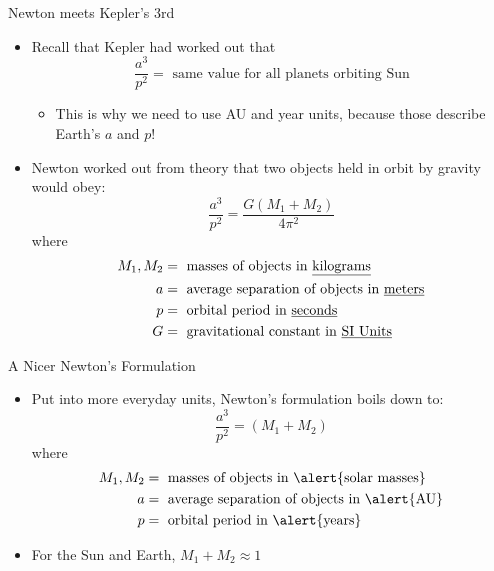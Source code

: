 \documentclass[pdf, aspectratio=169]{beamer}
\begin{document}
\begin{frame}{Newton meets Kepler's 3rd}
  \begin{itemize}
	\item Recall that Kepler had worked out that
	  \[\frac{a^3}{p^2}= \text{ same value for all planets orbiting Sun}\]
	  \begin{itemize}
		\item \alert{This is why we need to use AU and year units, because those describe Earth's $a$ and $p$!}
	  \end{itemize}
	\item<2> Newton worked out from theory that two objects held in orbit by gravity would obey:
	  \[\frac{a^3}{p^2} = \frac{G \left( M_1 + M_2 \right)}{4\pi^2}\]
	  where
	  \vspace{-2mm}
	  \scriptsize
	  \begin{align*}
		M_1, M_2 &= \text{ masses of objects in \underline{kilograms}}\\
		a &= \text{ average separation of objects in \underline{meters}}\\
		p &= \text{ orbital period in \underline{seconds}}\\
		G &= \text{ gravitational constant in \underline{SI Units}}
	  \end{align*}
  \end{itemize}
\end{frame}

\begin{frame}{A Nicer Newton's Formulation}
  \begin{itemize}
	\item Put into more everyday units, Newton's formulation boils down to:
		\[\frac{a^3}{p^2} = (M_1 + M_2)\]
	  where
	  \vspace{-2mm}
	  \begin{align*}
		  M_1, M_2 &= \text{ masses of objects in \alert{solar masses}}\\
		a &= \text{ average separation of objects in \alert{AU}}\\
		p &= \text{ orbital period in \alert{years}}\\
	  \end{align*}
  \item For the Sun and Earth, $M_1 + M_2 \approx 1$
  \end{itemize}
\end{frame}
\end{document}
